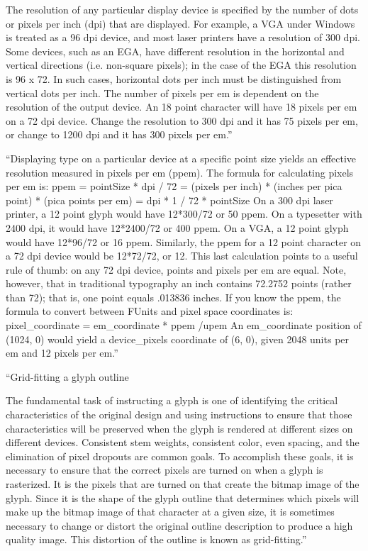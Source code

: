 \documentclass[12pt]{tufte-handout}
\numberwithin{equation}{subsection}
\numberwithin{equation}{subsection}
\begin{document}
\begin{appendices}
The resolution of any particular display device is specified by the number of dots or pixels per inch (dpi) that are displayed. For example, a VGA under Windows is treated as a 96 dpi device, and most laser printers have a resolution of 300 dpi. Some devices, such as an EGA, have different resolution in the horizontal and vertical directions (i.e. non-square pixels); in the case of the EGA this resolution is 96 x 72. In such cases, horizontal dots per inch must be distinguished from vertical dots per inch.
The number of pixels per em is dependent on the resolution of the output device. An 18 point character will have 18 pixels per em on a 72 dpi device. Change the resolution to 300 dpi and it has 75 pixels per em, or change to 1200 dpi and it has 300 pixels per em.''

``Displaying type on a particular device at a specific point size yields an effective resolution measured in pixels per em (ppem). The formula for calculating pixels per em is:
ppem = pointSize * dpi / 72
= (pixels per inch) * (inches per pica point) * (pica points per em)
= dpi * 1 / 72 * pointSize
On a 300 dpi laser printer, a 12 point glyph would have 12*300/72 or 50 ppem. On a typesetter with 2400 dpi, it would have 12*2400/72 or 400 ppem. On a VGA, a 12 point glyph would have 12*96/72 or 16 ppem. Similarly, the ppem for a 12 point character on a 72 dpi device would be 12*72/72, or 12. This last calculation points to a useful rule of thumb: on any 72 dpi device, points and pixels per em are equal. Note, however, that in traditional typography an inch contains 72.2752 points (rather than 72); that is, one point equals .013836 inches.
If you know the ppem, the formula to convert between FUnits and pixel space coordinates is:
pixel\_coordinate = em\_coordinate * ppem /upem
An em\_coordinate position of (1024, 0) would yield a device\_pixels coordinate of (6, 0), given 2048 units per em and 12 pixels per em.''

``Grid-fitting a glyph outline

The fundamental task of instructing a glyph is one of identifying the critical characteristics of the original design and using instructions to ensure that those characteristics will be preserved when the glyph is rendered at different sizes on different devices. Consistent stem weights, consistent color, even spacing, and the elimination of pixel dropouts are common goals.
To accomplish these goals, it is necessary to ensure that the correct pixels are turned on when a glyph is rasterized. It is the pixels that are turned on that create the bitmap image of the glyph. Since it is the shape of the glyph outline that determines which pixels will make up the bitmap image of that character at a given size, it is sometimes necessary to change or distort the original outline description to produce a high quality image. This distortion of the outline is known as grid-fitting.''



\end{appendices}
\end{document}
